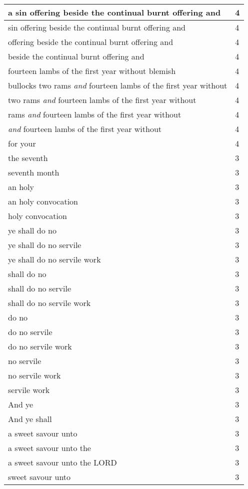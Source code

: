 \begin{center}
\begin{longtable}{|p{3.0in}|p{0.5in}|}
a sin offering beside the continual burnt offering and & 4\\ \hline 
sin offering beside the continual burnt offering and & 4\\ \hline 
offering beside the continual burnt offering and & 4\\ \hline 
beside the continual burnt offering and & 4\\ \hline 
fourteen lambs of the first year without blemish & 4\\ \hline 
bullocks two rams \emph{and} fourteen lambs of the first year without & 4\\ \hline 
two rams \emph{and} fourteen lambs of the first year without & 4\\ \hline 
rams \emph{and} fourteen lambs of the first year without & 4\\ \hline 
\emph{and} fourteen lambs of the first year without & 4\\ \hline 
for your & 4\\ \hline 
the seventh & 3\\ \hline 
seventh month & 3\\ \hline 
an holy & 3\\ \hline 
an holy convocation & 3\\ \hline 
holy convocation & 3\\ \hline 
ye shall do no & 3\\ \hline 
ye shall do no servile & 3\\ \hline 
ye shall do no servile work & 3\\ \hline 
shall do no & 3\\ \hline 
shall do no servile & 3\\ \hline 
shall do no servile work & 3\\ \hline 
do no & 3\\ \hline 
do no servile & 3\\ \hline 
do no servile work & 3\\ \hline 
no servile & 3\\ \hline 
no servile work & 3\\ \hline 
servile work & 3\\ \hline 
And ye & 3\\ \hline 
And ye shall & 3\\ \hline 
a sweet savour unto & 3\\ \hline 
a sweet savour unto the & 3\\ \hline 
a sweet savour unto the LORD & 3\\ \hline 
sweet savour unto & 3\\ \hline 

\end{longtable}
\end{center}
